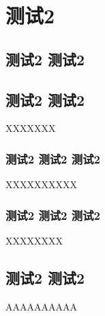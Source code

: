 \chapter*{测试2 }
\section{测试2 测试2 }
\section{测试2 测试2 }
XXXXXXX
\subsection{测试2 测试2 测试2 }
XXXXXXXXXX
\subsection{测试2 测试2 测试2 }
XXXXXXXX
\section{测试2 测试2 }
AAAAAAAAAA
\endinput